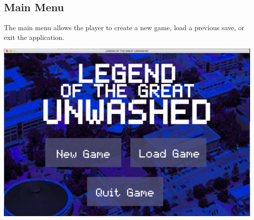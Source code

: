 \documentclass{article}
\begin{document}
	\subsection{Main Menu}
		The main menu allows the player to create a new game, load a previous save, or exit the application.
		\begin{center}
			\includegraphics[scale=0.3]{UMimages/mainMenu}
		\end{center} 
\end{document}
